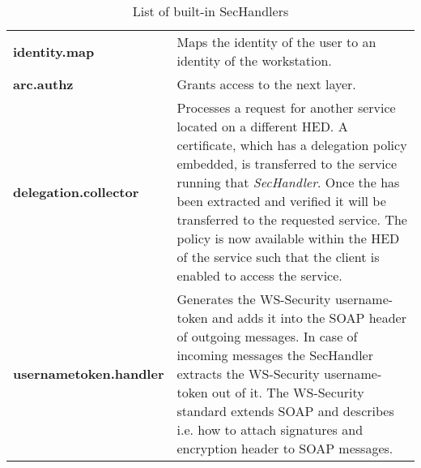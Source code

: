   \begin{table}[htb]
  \centering
  \caption{List of built-in SecHandlers}
  \label{tbl:list_of_sechandler}
  \begin{tabular*}{\textwidth}[t]{p{4cm}p{11cm}}
	\hline
 	\textbf{identity.map}         & Maps the identity of the user to an identity of the workstation.\\
 	\textbf{arc.authz}            & Grants access to the next layer.\\
 	\textbf{delegation.collector} & Processes a request for another service located on a different HED.
                                        A certificate, which has a delegation policy embedded, is transferred to the service running that \textit{SecHandler}. Once the has been extracted and verified it will be transferred
                                        to the requested service.
                                        The policy is now available within the HED of the service such that the client is enabled to access the service.\\
 	\textbf{usernametoken.handler}& Generates the WS-Security username-token and adds it into the SOAP header of outgoing
					 messages. In case of incoming messages the SecHandler extracts the WS-Security username-token out of it. The WS-Security standard extends SOAP and describes i.e. how to attach signatures and encryption header to SOAP messages.\\
	\hline
  \end{tabular*}
  \end{table}
%
